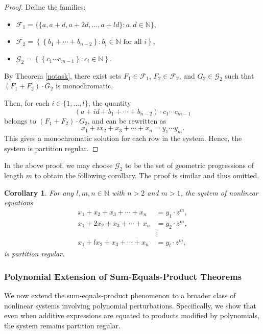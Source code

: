 \documentclass{article}
\theoremstyle{Theorem}
\newtheorem{cor}[thm]{Corollary}
\theoremstyle{definition}
\begin{document}
\begin{proof}
    Define the families:
    \begin{itemize}
        \item \( \mathcal{F}_1 = \{ \{a, a + d, a + 2d, \dots, a + ld\} : a, d \in \mathbb{N} \} \),
        \item \( \mathcal{F}_2 = \left\{ \left\{ b_1 + \cdots + b_{n-2} \right\} : b_i \in \mathbb{N} \text{ for all } i \right\} \),
        \item \( \mathcal{G}_2 = \left\{ \left\{ c_1 \cdots c_{m-1} \right\} : c_i \in \mathbb{N} \right\} \).
    \end{itemize}

    By Theorem \ref{notask}, there exist sets \( F_1 \in \mathcal{F}_1 \), \( F_2 \in \mathcal{F}_2 \), and \( G_2 \in \mathcal{G}_2 \) such that \( (F_1 + F_2) \cdot G_2 \) is monochromatic.

    Then, for each \( i \in \{1, \dots, l\} \), the quantity
    \[
    (a + i d + b_1 + \cdots + b_{n-2}) \cdot c_1 \cdots c_{m-1}
    \]
    belongs to \( (F_1 + F_2) \cdot G_2 \), and can be rewritten as
    \[
    x_1 + i x_2 + x_3 + \cdots + x_n = y_1 \cdots y_m.
    \]
    This gives a monochromatic solution for each row in the system. Hence, the system is partition regular.
\end{proof}

In the above proof, we may choose \( \mathcal{G}_2 \) to be the set of geometric progressions of length \( m \) to obtain the following corollary. The proof is similar and thus omitted.

\begin{cor}
    For any \( l, m, n \in \mathbb{N} \) with \( n > 2 \) and \( m > 1 \), the system of nonlinear equations
    \begin{align*}
        x_1 + x_2 + x_3 + \cdots + x_n &= y_1 \cdot z^m, \\
        x_1 + 2 x_2 + x_3 + \cdots + x_n &= y_2 \cdot z^m, \\
        &\vdots \\
        x_1 + l x_2 + x_3 + \cdots + x_n &= y_l \cdot z^m,
    \end{align*}
    is partition regular.
\end{cor}



\subsubsection{Polynomial Extension of Sum-Equals-Product Theorems}
We now extend the sum-equals-product phenomenon to a broader class of nonlinear systems involving polynomial perturbations. Specifically, we show that even when additive expressions are equated to products modified by polynomials, the system remains partition regular.
\end{document}
